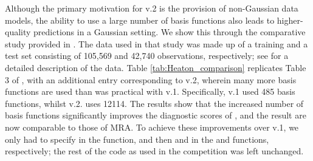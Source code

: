 \documentclass[article]{jss}
\newcommand{\red}[1]{\textcolor{red}{#1}}
\newcommand{\fct}[1]{\code{#1()}}
\begin{document}
Although the primary motivation for  v.2 is the provision of non-Gaussian data models, the ability to use  a large number of basis functions also leads to higher-quality predictions in a Gaussian setting.
We show this through the comparative study provided in \cite{Heaton_2019_comparative_study}.
The data used in that study was made up of a training and a test set consisting of 105,569 and 42,740 observations, respectively; see \cite{Heaton_2019_comparative_study} for a detailed description of the data.
Table \ref{tab:Heaton_comparison} replicates Table 3 of \cite{Heaton_2019_comparative_study}, with an additional entry corresponding to  v.2, wherein many more basis functions are used than was practical with  v.1.
 Specifically,  v.1 used 485 basis functions, whilst  v.2. uses 12114.
The results show that the increased number of basis functions significantly improves the diagnostic scores of , and the result are now comparable to those of MRA. 
To achieve these improvements over  v.1, we only had to specify  in the \fct{auto\_basis} function, and then  and  in the \fct{SRE} and \fct{SRE.fit} functions, respectively; the rest of the  code as used in the competition was left unchanged. 




%
%
\end{document}
